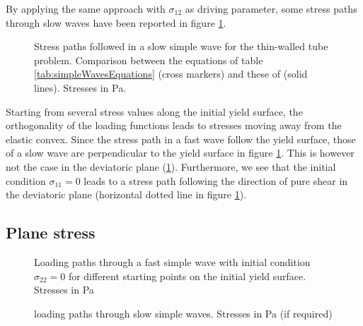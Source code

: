 By applying the same approach with $\sigma_{12}$ as driving parameter, some stress paths through slow waves have been reported in figure \ref{fig:tw_slow}.
\begin{figure}[h!]
  \centering
   \qquad
  \caption{Stress paths followed in a slow simple wave for the thin-walled tube problem. Comparison between the equations of table \ref{tab:simpleWavesEquations} (cross markers) and these of \cite{Clifton} (solid lines). Stresses in Pa.}
  \label{fig:tw_slow}
\end{figure}
Starting from several stress values along the initial yield surface, the orthogonality of the loading functions leads to stresses moving away from the elastic convex.
Since the stress path in a fast wave follow the yield surface, those of a slow wave are perpendicular to the yield surface in figure \ref{fig:tw_slow}.
This is however not the case in the deviatoric plane (\ref{fig:tw_slow}).
Furthermore, we see that the initial condition $\sigma_{11}=0$ leads to a stress path following the direction of pure shear in the deviatoric plane (horizontal dotted line in figure \ref{fig:tw_slow}).
\subsection{Plane stress}

\begin{figure}[h!]
  \centering
  \caption{Loading paths through a fast simple wave with initial condition $\sigma_{22}=0$ for different starting points on the initial yield surface. Stresses in Pa}
  \label{fig:fast_path_plane_strains}
\end{figure}


\begin{figure}[h!]
  \centering
  \caption{loading paths through slow simple waves. Stresses in Pa (if required)}
  \label{fig:slow_path_plane_strains}
\end{figure}

